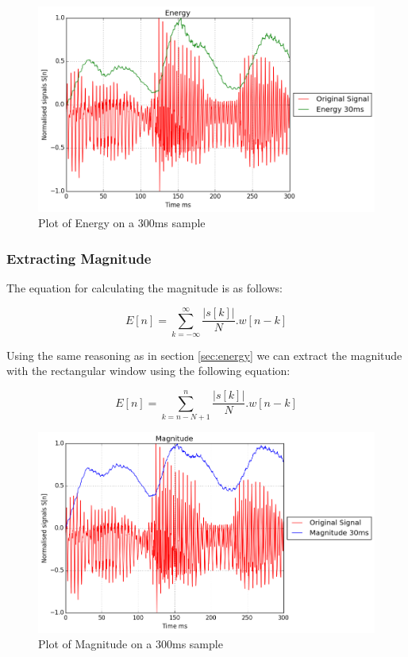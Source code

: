 \documentclass[a4paper]{article}
\begin{document}
\begin{figure}[H]
\begin{center}
\includegraphics[width=\textwidth, height=\textheight, keepaspectratio]{images/energy.png}
\caption{Plot of Energy on a 300ms sample}
\end{center}
\end{figure}



\subsubsection{Extracting Magnitude}

The equation for calculating the magnitude is as follows:

\begin{equation}
 E[n] = \sum_{k=-\infty}^{\infty}\frac{|s[k]|}{N}.w[n-k]
\end{equation}

Using the same reasoning as in section \ref{sec:energy} we can extract the
magnitude with the rectangular window using the following equation:

\begin{equation}
 E[n] = \sum_{k=n-N+1}^{n}\frac{|s[k]|}{N}.w[n-k]
\end{equation}


\begin{figure}[H]
\begin{center}
\includegraphics[width=\textwidth, height=\textheight, keepaspectratio]{images/magnitude.png}
\caption{Plot of Magnitude on a 300ms sample}
\end{center}
\end{figure}
\end{document}

